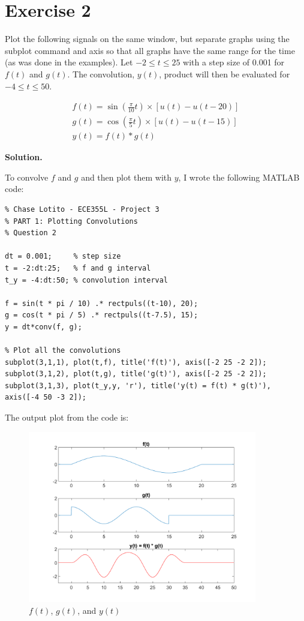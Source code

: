 \documentclass{article}
\begin{document}
\clearpage

\section*{Exercise 2}

Plot the following signals on the same window, but separate graphs using the subplot command and axis so that all graphs have the same range for the time (as was done in the examples). Let \(-2 \leq t \leq 25\) with a step size of 0.001 for \(f(t)\) and \(g(t)\). The convolution, \(y(t)\), product will then be evaluated for \(-4 \leq t \leq 50\).

\begin{equation*}
    \begin{gathered}
        f(t) = \sin \left( \frac{\pi}{10} t \right) \times [u(t) - u(t-20)] \\
        g(t) = \cos \left( \frac{\pi}{5} t \right) \times [u(t) - u(t-15)]  \\
        y(t) = f(t) * g(t)
    \end{gathered}
\end{equation*}

\smallskip

\textbf{Solution.}

\smallskip

To convolve \(f\) and \(g\) and then plot them with \(y\), I wrote the following MATLAB code:

\begin{lstlisting}
% Chase Lotito - ECE355L - Project 3
% PART 1: Plotting Convolutions
% Question 2

dt = 0.001;     % step size
t = -2:dt:25;   % f and g interval
t_y = -4:dt:50; % convolution interval

f = sin(t * pi / 10) .* rectpuls((t-10), 20);
g = cos(t * pi / 5) .* rectpuls((t-7.5), 15);
y = dt*conv(f, g);

% Plot all the convolutions
subplot(3,1,1), plot(t,f), title('f(t)'), axis([-2 25 -2 2]);
subplot(3,1,2), plot(t,g), title('g(t)'), axis([-2 25 -2 2]);
subplot(3,1,3), plot(t_y,y, 'r'), title('y(t) = f(t) * g(t)'), axis([-4 50 -3 2]);
\end{lstlisting}

The output plot from the code is:

\begin{figure}[!ht] 
    \centering
    \includegraphics[width = 10cm]{plot3.png}
    \caption{\(f(t)\), \(g(t)\), and \(y(t)\)}
    \label{fig:thirdplot}
\end{figure}
\end{document}

